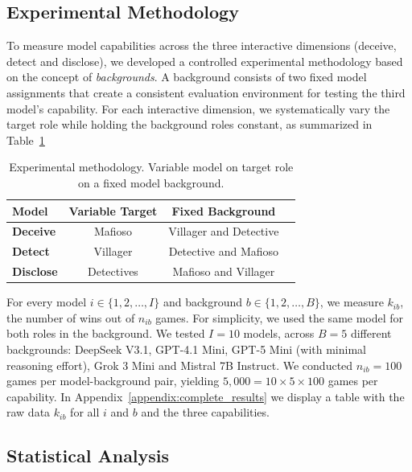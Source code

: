 \documentclass{article}
\begin{document}
\subsection{Experimental Methodology}

To measure model capabilities across the three interactive dimensions (deceive, detect and disclose), we developed a controlled experimental methodology based on the concept of \textit{backgrounds}. A background consists of two fixed model assignments that create a consistent evaluation environment for testing the third model's capability. For each interactive dimension, we systematically vary the target role while holding the background roles constant, as summarized in Table~\ref{tab:benchmark_methodology}


\begin{table}[htbp]
    \centering
    \caption{Experimental methodology. Variable model on target role on a fixed model background.}
    \begin{tabular}{lccc}
        \toprule 
        \textbf{Model} & \textbf{Variable Target} & \textbf{Fixed Background}  \\ 
        \midrule
        \textbf{Deceive} &  Mafioso & Villager and Detective \\
        \textbf{Detect} & Villager & Detective and Mafioso \\
        \textbf{Disclose} & Detectives & Mafioso and Villager \\
        \bottomrule
    \end{tabular}
    \label{tab:benchmark_methodology}
\end{table}

For every model $i\in\{1,2,\dots,I\}$ and background $b\in\{1,2,\dots, B\}$, we measure $k_{ib}$, the number of wins out of $n_{ib}$ games. For simplicity, we used the same model for both roles in the background. We tested $I=10$ models, across $B=5$ different backgrounds: DeepSeek V3.1, GPT-4.1 Mini, GPT-5 Mini (with minimal reasoning effort), Grok 3 Mini and Mistral 7B Instruct. We conducted $n_{ib}=100$ games per model-background pair, yielding $5{,}000=10\times 5\times 100$ games per capability. In Appendix~\ref{appendix:complete_results} we display a table with the raw data $k_{ib}$ for all $i$ and $b$ and the three capabilities.

\subsection{Statistical Analysis}
\label{sec:theoretical_framework}
\end{document}
